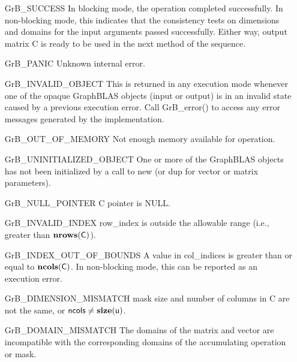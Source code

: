 \begin{itemize}[leftmargin=2.1in]
    \item[{\sf GrB\_SUCCESS}]         In blocking mode, the operation completed
    successfully. In non-blocking mode, this indicates that the consistency 
    tests on dimensions and domains for the input arguments passed successfully. 
    Either way, output matrix {\sf C} is ready to be used in the next method of 
    the sequence.

    \item[{\sf GrB\_PANIC}]            Unknown internal error.

    \item[{\sf GrB\_INVALID\_OBJECT}] This is returned in any execution mode 
    whenever one of the opaque GraphBLAS objects (input or output) is in an invalid 
    state caused by a previous execution error.  Call {GrB\_error()} to access 
    any error messages generated by the implementation.

    \item[{\sf GrB\_OUT\_OF\_MEMORY}]  Not enough memory available for operation.

    \item[{\sf GrB\_UNINITIALIZED\_OBJECT}] One or more of the GraphBLAS objects
    has not been initialized by a call to {\sf new} (or {\sf dup} for vector or
    matrix parameters).

    \item[{\sf GrB\_NULL\_POINTER}]    {\sf C} pointer is {\sf NULL}.

    \item[{\sf GrB\_INVALID\_INDEX}]    {\sf row\_index} is outside the allowable 
    range (i.e., greater than $\bold{nrows}({\sf C})$).

    \item[{\sf GrB\_INDEX\_OUT\_OF\_BOUNDS}]  A value in {\sf col\_indices} 
    is greater than or equal to $\bold{ncols}({\sf C})$.  In 
    non-blocking mode, this can be reported as an execution error.

    \item[{\sf GrB\_DIMENSION\_MISMATCH}] {\sf mask} size and number of columns
    in {\sf C} are not the same, or ${\sf ncols} \neq \bold{size}({\sf u})$.

    \item[{\sf GrB\_DOMAIN\_MISMATCH}]     The domains of the matrix and vector
    are incompatible with the corresponding domains of the accumulating 
    operation or mask.
\end{itemize}

